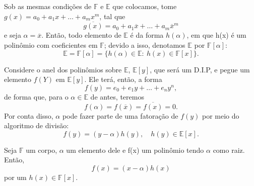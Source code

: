 \documentclass[../algebraIII_notes.tex]{subfiles}
\begin{document}
Sob as mesmas condições de \(\mathbb{F}\) e \(\mathbb{E}\) que colocamos, tome \(g(x) = a_{0}+a_{1}x + \dotsc + a_{m}x^{m}\), tal que
\[
	\overline{g(x)} = a_{0} + a_1\overline{x}+\dotsc +a_{m}\overline{x}^{m}
\]
e seja \(\alpha  = \overline{x}.\) Então, todo elemento de \(\mathbb{E}\) é da forma \(h(\alpha )\), em que h(x) é um polinômio com coeficientes em \(\mathbb{F}\); devido a isso, denotamos \(\mathbb{E}\) por \(\mathbb{F}[\alpha ]\):
\[
	\mathbb{E} = \mathbb{F}[\alpha ] = \{h(\alpha )\in \mathbb{E}:\: h(x)\in \mathbb{F}[x]\}.
\]

Considere o anel dos polinômios sobre \(\mathbb{E}\), \(\mathbb{E}[y]\), que será um D.I.P, e pegue um elemento \(f(Y)\) em \(\mathbb{E}[y]\). Ele terá, então, a forma
\[
	f(y) = e_{0} + e_{1}y + \dotsc + e_{n}y^{n},
\]
de forma que, para o \(\alpha \in \mathbb{E}\) de antes, teremos
\[
	f(\alpha ) = f(\overline{x}) = \overline{f(x)} = 0.
\]
Por conta disso, \(\alpha \) pode fazer parte de uma fatoração de \(f(y)\) por meio do algoritmo de divisão:
\[
	f(y) = (y-\alpha )h(y),\quad h(y)\in \mathbb{E}[x].
\]
\begin{exr}
	Seja \(\mathbb{F}\) um corpo, \(\alpha \) um elemento dele e f(x) um polinômio tendo \(\alpha \) como raiz. Então,
	\[
		f(x) = (x-\alpha )h(x)
	\]
	por um \(h(x)\in \mathbb{F}[x]\).
\end{exr}
\end{document}
